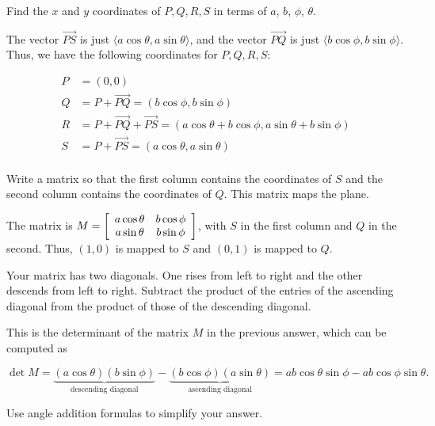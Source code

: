 \documentclass[../key.tex]{subfiles}
\begin{document}
\begin{inner_problem}
\item Find the $x$ and $y$ coordinates of $P,Q,R,S$ in terms of $a$, $b$, $\phi$, $\theta$.
\end{inner_problem}

The vector $\overrightarrow{PS}$ is just $\langle a\cos \theta, a\sin\theta \rangle$, and the vector $\overrightarrow{PQ}$ is just $\langle b\cos\phi, b\sin\phi \rangle$. Thus, we have the following coordinates for $P,Q,R,S$:

\begin{align*}
    P &= (0,0) \\
    Q &= P+\overrightarrow{PQ} = (b\cos\phi, b\sin\phi) \\
    R &= P+\overrightarrow{PQ}+\overrightarrow{PS} = (a\cos\theta + b\cos\phi, a\sin\theta + b\sin\phi) \\
    S &= P+\overrightarrow{PS} = (a\cos\theta, a\sin\theta) \\
\end{align*}

\begin{inner_problem}
\item Write a matrix so that the first column contains the coordinates of $S$ and the second column contains the coordinates of $Q$. This matrix maps the plane.
\end{inner_problem}

The matrix is $M=\left[\begin{array}{cc} a\cos\theta & b\cos\phi \\ a\sin\theta & b\sin\phi \end{array}\right]$, with $S$ in the first column and $Q$ in the second. Thus, $(1,0)$ is mapped to $S$ and $(0,1)$ is mapped to $Q$.

\begin{inner_problem}
\item Your matrix has two diagonals. One rises from left to right and the other descends from left to right. Subtract the product of the entries of the ascending diagonal from the product of those of the descending diagonal.
\end{inner_problem}

This is the determinant of the matrix $M$ in the previous answer, which can be computed as

$$\operatorname{det} M = \underbrace{(a\cos\theta)(b\sin\phi)}_{\text{descending diagonal}} - \underbrace{(b\cos\phi)(a\sin\theta)}_{\text{ascending diagonal}} = ab\cos\theta\sin\phi - ab\cos\phi\sin\theta.$$

\begin{inner_problem}
\item Use angle addition formulas to simplify your answer.
\end{inner_problem}
\end{document}
